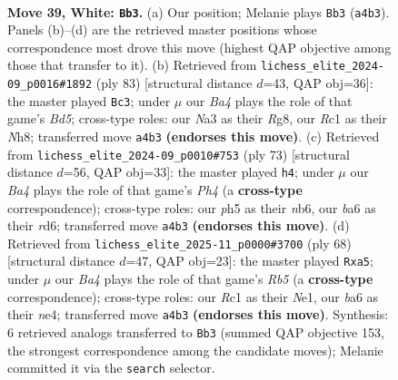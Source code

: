 \documentclass[11pt]{article}
\begin{document}
\clearpage

\begin{figure}[p]\centering
\begin{subfigure}{0.46\textwidth}\centering
\resizebox{\linewidth}{!}{%
\newchessgame
\chessboard[
  setfen={r7/p2p2k1/bppn4/5p1p/BPP2P2/N7/P2P3P/2R1K3 w - - 2 39},
  showmover=false,
  pgfstyle=straightmove, color=movearrow, markmove={a4-b3}
]}
\caption{}
\end{subfigure}\hfill
\begin{subfigure}{0.46\textwidth}\centering
\resizebox{\linewidth}{!}{%
\newchessgame
\chessboard[
  setfen={6rn/4k3/4p1p1/4P1Pp/pp1b1P1N/3B2P1/P1R4K/8 b - - 2 42},
  showmover=false,
  pgfstyle=straightmove, color=movearrow, markmove={d4-c3}
]}
\caption{}
\end{subfigure}
\\[4pt]
\begin{subfigure}{0.46\textwidth}\centering
\resizebox{\linewidth}{!}{%
\newchessgame
\chessboard[
  setfen={4r2k/6n1/pN1Rp3/2p1P1pp/5pP1/1B3P1P/PP3K2/8 b - - 0 37},
  showmover=false,
  pgfstyle=straightmove, color=movearrow, markmove={h5-h4}
]}
\caption{}
\end{subfigure}\hfill
\begin{subfigure}{0.46\textwidth}\centering
\resizebox{\linewidth}{!}{%
\newchessgame
\chessboard[
  setfen={2r3k1/4p2p/3p2p1/pR1P1p2/4nP1P/2P5/P5P1/4N1K1 w - - 0 35},
  showmover=false,
  pgfstyle=straightmove, color=movearrow, markmove={b5-a5}
]}
\caption{}
\end{subfigure}
\caption{\textbf{Move 39, White: \texttt{Bb3}.} (a) Our position; Melanie plays \texttt{Bb3} (\texttt{a4b3}). Panels (b)--(d) are the retrieved master positions whose correspondence most drove this move (highest QAP objective among those that transfer to it). (b) Retrieved from \texttt{lichess\_elite\_2024-09\_p0016\#1892} (ply 83) [structural distance $d$=43, QAP obj=36]: the master played \texttt{Bc3}; under $\mu$ our \emph{Ba4} plays the role of that game's \emph{Bd5}; cross-type roles: our \emph{N}a3 as their \emph{R}g8, our \emph{R}c1 as their \emph{N}h8; transferred move \texttt{a4b3} \textbf{(endorses this move)}. (c) Retrieved from \texttt{lichess\_elite\_2024-09\_p0010\#753} (ply 73) [structural distance $d$=56, QAP obj=33]: the master played \texttt{h4}; under $\mu$ our \emph{Ba4} plays the role of that game's \emph{Ph4} (a \textbf{cross-type} correspondence); cross-type roles: our \emph{p}h5 as their \emph{n}b6, our \emph{b}a6 as their \emph{r}d6; transferred move \texttt{a4b3} \textbf{(endorses this move)}. (d) Retrieved from \texttt{lichess\_elite\_2025-11\_p0000\#3700} (ply 68) [structural distance $d$=47, QAP obj=23]: the master played \texttt{Rxa5}; under $\mu$ our \emph{Ba4} plays the role of that game's \emph{Rb5} (a \textbf{cross-type} correspondence); cross-type roles: our \emph{R}c1 as their \emph{N}e1, our \emph{b}a6 as their \emph{n}e4; transferred move \texttt{a4b3} \textbf{(endorses this move)}. Synthesis: 6 retrieved analogs transferred to \texttt{Bb3} (summed QAP objective 153, the strongest correspondence among the candidate moves); Melanie committed it via the \texttt{search} selector.}
\label{fig:thought-m76}
\end{figure}
\end{document}
